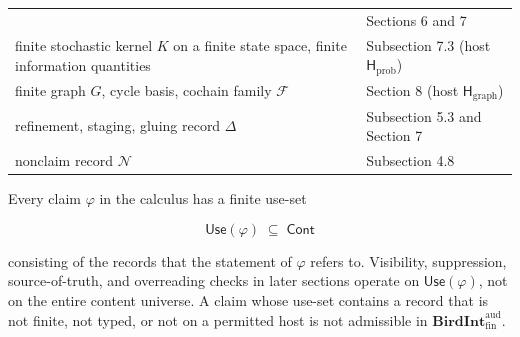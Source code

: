 \documentclass[11pt]{article}
\theoremstyle{definition}
\begin{document}
\begin{longtable}[]{@{}ll@{}}
\begin{minipage}[t]{0.47\columnwidth}
\end{minipage} & \begin{minipage}[t]{0.47\columnwidth}\raggedright
Sections 6 and 7\strut
\end{minipage}\tabularnewline
\begin{minipage}[t]{0.47\columnwidth}\raggedright
finite stochastic kernel \(K\) on a finite state space, finite information quantities\strut
\end{minipage} & \begin{minipage}[t]{0.47\columnwidth}\raggedright
Subsection 7.3 (host \(\mathsf H_{\mathrm{prob}}\))\strut
\end{minipage}\tabularnewline
\begin{minipage}[t]{0.47\columnwidth}\raggedright
finite graph \(G\), cycle basis, cochain family \(\mathcal F\)\strut
\end{minipage} & \begin{minipage}[t]{0.47\columnwidth}\raggedright
Section 8 (host \(\mathsf H_{\mathrm{graph}}\))\strut
\end{minipage}\tabularnewline
\begin{minipage}[t]{0.47\columnwidth}\raggedright
refinement, staging, gluing record \(\Delta\)\strut
\end{minipage} & \begin{minipage}[t]{0.47\columnwidth}\raggedright
Subsection 5.3 and Section 7\strut
\end{minipage}\tabularnewline
\begin{minipage}[t]{0.47\columnwidth}\raggedright
nonclaim record \(\mathcal N\)\strut
\end{minipage} & \begin{minipage}[t]{0.47\columnwidth}\raggedright
Subsection 4.8\strut
\end{minipage}\tabularnewline
\bottomrule
\end{longtable}

Every claim \(\varphi\) in the calculus has a finite use-set

\[
\mathsf{Use}(\varphi)\;\subseteq\;\mathsf{Cont}
\]

consisting of the records that the statement of \(\varphi\) refers to. Visibility, suppression, source-of-truth, and overreading checks in later sections operate on \(\mathsf{Use}(\varphi)\), not on the entire content universe. A claim whose use-set contains a record that is not finite, not typed, or not on a permitted host is not admissible in \(\mathbf{BirdInt}^{\mathrm{aud}}_{\mathrm{fin}}\).
\end{document}
